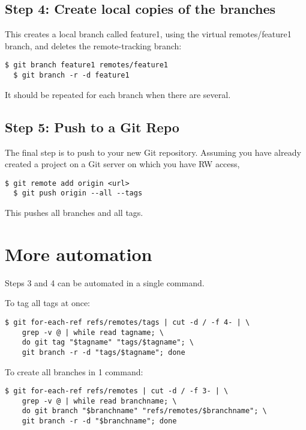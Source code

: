 \documentclass{../common/tufte-latex/tufte-handout}
\begin{document}
\subsection{Step 4: Create local copies of the branches}

This creates a local branch called feature1, using the virtual remotes/feature1 branch, and deletes the remote-tracking branch:
\begin{lstlisting}[style=BashInputStyle]
  $ git branch feature1 remotes/feature1
  $ git branch -r -d feature1
\end{lstlisting}

It should be repeated for each branch when there are several.

\subsection{Step 5: Push to a Git Repo}

The final step is to push to your new Git repository.
Assuming you have already created a project on a Git server on which you have RW access,

\begin{lstlisting}[style=BashInputStyle]
  $ git remote add origin <url>
  $ git push origin --all --tags
\end{lstlisting}

This pushes all branches and all tags.

\section{More automation}

Steps 3 and 4 can be automated in a single command.

To tag all tags at once:
\begin{lstlisting}[style=BashInputStyle]
  $ git for-each-ref refs/remotes/tags | cut -d / -f 4- | \
    grep -v @ | while read tagname; \
    do git tag "$tagname" "tags/$tagname"; \
    git branch -r -d "tags/$tagname"; done
\end{lstlisting}

To create all branches in 1 command:
\begin{lstlisting}[style=BashInputStyle]
  $ git for-each-ref refs/remotes | cut -d / -f 3- | \
    grep -v @ | while read branchname; \
    do git branch "$branchname" "refs/remotes/$branchname"; \
    git branch -r -d "$branchname"; done
\end{lstlisting}
\end{document}
